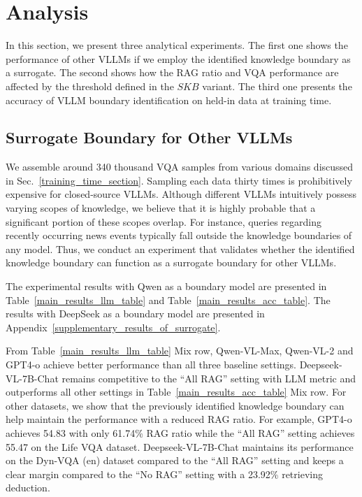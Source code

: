 \section{Analysis}
\label{analysis}

In this section, we present three analytical experiments. The first one shows the performance of other VLLMs if we employ the identified knowledge boundary as a surrogate. The second shows how the RAG ratio and VQA performance are affected by the threshold defined in the $SKB$ variant. The third one presents the accuracy of VLLM boundary identification on held-in data at training time. 


\subsection{Surrogate Boundary for Other VLLMs}
\label{plugin_section}

We assemble around 340 thousand VQA samples from various domains discussed in Sec.~\ref{training_time_section}. Sampling each data thirty times is prohibitively expensive for closed-source VLLMs. Although different VLLMs intuitively possess varying scopes of knowledge, we believe that it is highly probable that a significant portion of these scopes overlap.
For instance, queries regarding recently occurring news events typically fall outside the knowledge boundaries of any model. Thus, we conduct an experiment that validates whether the identified knowledge boundary can function as a surrogate boundary for other VLLMs.


The experimental results with Qwen as a boundary model are presented in Table~\ref{main_results_llm_table} and Table~\ref{main_results_acc_table}. The results with DeepSeek as a boundary model are presented in Appendix~\ref{supplementary_results_of_surrogate}.


From Table~\ref{main_results_llm_table} Mix row, Qwen-VL-Max, Qwen-VL-2 and GPT4-o achieve better performance than all three baseline settings. Deepseek-VL-7B-Chat remains competitive to the ``All RAG'' setting with LLM metric and outperforms all other settings in Table~\ref{main_results_acc_table} Mix row. For other datasets, we show that the previously identified knowledge boundary can help maintain the performance with a reduced RAG ratio. For example, GPT4-o achieves 54.83 with only 61.74\% RAG ratio while the ``All RAG'' setting achieves 55.47 on the Life VQA dataset. Deepseek-VL-7B-Chat maintains its performance on the Dyn-VQA (en) dataset compared to the ``All RAG'' setting and keeps a clear margin compared to the ``No RAG'' setting with a 23.92\% retrieving deduction.



